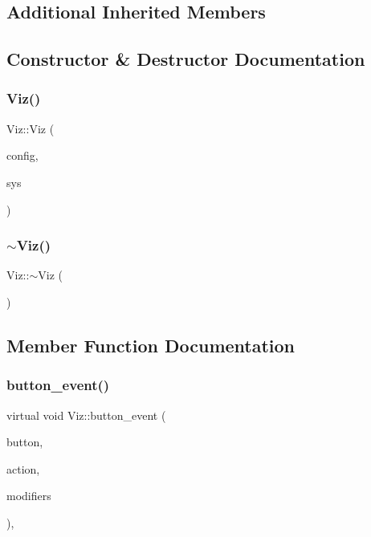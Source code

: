 \subsection*{Additional Inherited Members}


\subsection{Constructor \& Destructor Documentation}
\mbox{\label{classViz_a6fa941420a23ec54d8474a082c1473dd}} 
\subsubsection{\texorpdfstring{Viz()}{Viz()}}
{\footnotesize\ttfamily Viz\+::\+Viz (\begin{DoxyParamCaption}\item[{\mbox{\hyperlink{classConfigViz}{Config\+Viz}} $\ast$}]{config,  }\item[{\mbox{\hyperlink{classSys}{Sys}} $\ast$}]{sys }\end{DoxyParamCaption})}

\mbox{\label{classViz_ac81b579cf0fc229d729887bc1ec09c73}} 
\subsubsection{\texorpdfstring{$\sim$\+Viz()}{~Viz()}}
{\footnotesize\ttfamily Viz\+::$\sim$\+Viz (\begin{DoxyParamCaption}{ }\end{DoxyParamCaption})}



\subsection{Member Function Documentation}
\mbox{\label{classViz_aaf5e987b9e03579f26bf86256ff7dcfd}} 
\subsubsection{\texorpdfstring{button\+\_\+event()}{button\_event()}}
{\footnotesize\ttfamily virtual void Viz\+::button\+\_\+event (\begin{DoxyParamCaption}\item[{int}]{button,  }\item[{int}]{action,  }\item[{int}]{modifiers }\end{DoxyParamCaption})\hspace{0.3cm}{\ttfamily [protected]}, {\ttfamily [virtual]}}



